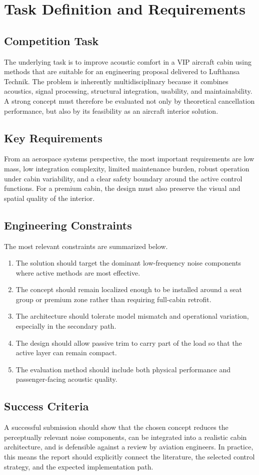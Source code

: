 \chapter{Task Definition and Requirements}

\section{Competition Task}
The underlying task is to improve acoustic comfort in a VIP aircraft cabin using methods that are suitable for an engineering proposal delivered to Lufthansa Technik. The problem is inherently multidisciplinary because it combines acoustics, signal processing, structural integration, usability, and maintainability. A strong concept must therefore be evaluated not only by theoretical cancellation performance, but also by its feasibility as an aircraft interior solution.

\section{Key Requirements}
From an aerospace systems perspective, the most important requirements are low mass, low integration complexity, limited maintenance burden, robust operation under cabin variability, and a clear safety boundary around the active control functions. For a premium cabin, the design must also preserve the visual and spatial quality of the interior.

\section{Engineering Constraints}
The most relevant constraints are summarized below.
\begin{enumerate}
    \item The solution should target the dominant low-frequency noise components where active methods are most effective.
    \item The concept should remain localized enough to be installed around a seat group or premium zone rather than requiring full-cabin retrofit.
    \item The architecture should tolerate model mismatch and operational variation, especially in the secondary path.
    \item The design should allow passive trim to carry part of the load so that the active layer can remain compact.
    \item The evaluation method should include both physical performance and passenger-facing acoustic quality.
\end{enumerate}

\section{Success Criteria}
A successful submission should show that the chosen concept reduces the perceptually relevant noise components, can be integrated into a realistic cabin architecture, and is defensible against a review by aviation engineers. In practice, this means the report should explicitly connect the literature, the selected control strategy, and the expected implementation path.
